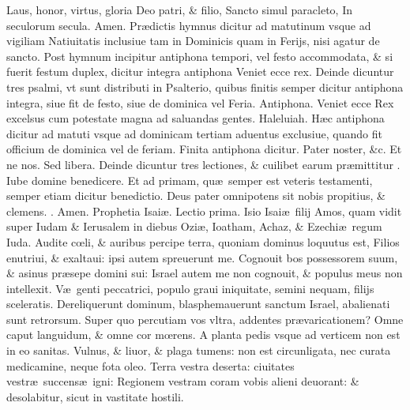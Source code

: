\documentclass[a5paper,10pt]{book}
\makeatletter
\def\leftmarginnote{%
	\lrmarginnote{\hskip -\marginparsep \hskip -6.5em}}
\DeclareRobustCommand{\Vbar}{\vers@resp{-0.1em}{V}}
\DeclareRobustCommand{\Rbar}{\vers@resp{0pt}{R}}
\newcommand{\vers@resp@sym}{\raisebox{0.2ex}{\rotatebox[origin=c]{-20}{$\m@th\rceil$}}}
\newcommand{\vers@resp}[2]{%
  {\ooalign{\hidewidth\kern#1\vers@resp@sym\hidewidth\cr#2\cr}}%
}%
\def\ae{æ}
\def\oe{œ}
\makeatother
\begin{document}
\begin{multicols*}{2}
\newline \color{red} L\color{black}aus, honor, virtus, gloria Deo patri, \& filio, Sancto simul paracleto, In seculorum secula. Amen.
\newline {} \color{red} Pr\ae dictis hymnus dicitur ad matutinum vsque ad vigiliam Natiuitatis inclusiue tam in Dominicis quam in Ferijs, nisi agatur de sancto.
Post hymnum incipitur antiphona tempori, vel festo accommodata, \& si fuerit festum duplex, dicitur integra antiphona \color{black} Veniet ecce rex. \color{red}
Deinde dicuntur tres psalmi, vt sunt distributi in Psalterio, quibus finitis semper dicitur antiphona integra, siue fit de festo, siue de dominica vel Feria. Antiphona. \color{black}
Veniet ecce Rex excelsus cum potestate magna ad saluandas gentes. Haleluiah.
\color{red} H\ae c antiphona dicitur ad matuti vsque ad dominicam tertiam aduentus exclusiue, quando fit officium de dominica vel de feriam. %
Finita antiphona dicitur. \color{black} Pater noster, \&c. Et ne nos. Sed libera. \color{black}
\color{red} Deinde dicuntur tres lectiones, \& cuilibet earum pr\ae mittitur \Vbar . \color{black} Iube domine benedicere.
\color{red} Et ad primam, qu\ae \ semper est veteris testamenti, semper etiam dicitur benedictio. \color{black} Deus pater omnipotens sit nobis propitius, \& clemens. \color{red} \Rbar . \color{black} Amen.
\newline \color{red} Prophetia Isai\ae . \hfill Lectio prima. \color{black}
\vspace{-1em}
Isio\leftmarginnote{\begin{flushright}ca. 1.\end{flushright}} Isai\ae \ filij Amos, quam vidit super Iudam \& Ierusalem in diebus Ozi\ae , Ioatham, Achaz, \& Ezechi\ae \ regum Iuda. 
Audite c\oe li, \& auribus percipe terra, quoniam dominus loquutus est, Filios enutriui, \& exaltaui: ipsi autem spreuerunt me.
Cognouit bos possessorem suum, \& asinus pr\ae sepe domini sui: Israel autem me non cognouit, \& populus meus non intellexit.
V\ae \ genti peccatrici, populo graui iniquitate, semini nequam, filijs sceleratis.
Dereliquerunt dominum, blasphemauerunt sanctum Israel, abalienati sunt retrorsum. 
Super quo percutiam vos vltra, addentes pr\ae varicationem?
Omne caput languidum, \& omne cor m\oe rens.
A planta pedis vsque ad verticem non est in eo sanitas.
Vulnus, \& liuor, \& plaga tumens: non est circunligata, nec curata medicamine, neque fota oleo.
Terra vestra deserta: ciuitates vestr\ae \ succens\ae \ igni: Regionem vestram coram vobis alieni deuorant: \& desolabitur, sicut in vastitate hostili. 

\end{multicols*}
\end{document}
